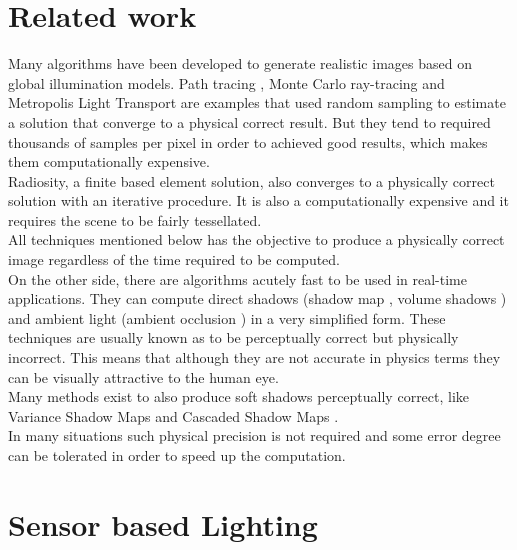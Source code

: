 \documentclass[10pt, conference]{IEEEtran}
\begin{document}
\section{Related work}
%
Many algorithms have been developed to generate realistic images based on global illumination models. 
Path tracing \cite{The_rendering_equation}, Monte Carlo ray-tracing \cite{Montecarlo_Ray_tracing} and Metropolis Light Transport \cite{Metropolis_light_transport} are examples that used random sampling to 
estimate a solution that converge to a physical correct result. But they tend to required thousands of samples per pixel in order to 
achieved good results, which makes them computationally expensive.\\

Radiosity, a finite based element solution, also converges to a physically correct solution with an iterative procedure. 
It is also a computationally expensive and it requires the scene to be fairly tessellated.\\ 

All techniques mentioned below has the objective to produce a physically correct image regardless of the time required to be computed.\\

On the other side, there are algorithms acutely fast to be used in real-time applications. 
They can compute direct shadows (shadow map \cite{shadow_map}, volume shadows \cite{real_time_shadows}) and ambient light (ambient occlusion \cite{ambient_occlusion}) 
in a very simplified form. These techniques are usually known as to be perceptually correct but physically incorrect. 
This means that although they are not accurate in physics terms they can be visually attractive to the human eye.\\

Many methods exist to also produce soft shadows perceptually correct, like Variance Shadow Maps \cite{shadow_map} and Cascaded Shadow Maps \cite{real_time_shadows}.\\

In many situations such physical precision is not required and some error degree can be tolerated in order to speed up the computation. 


\section{Sensor based Lighting}
%
\end{document}
